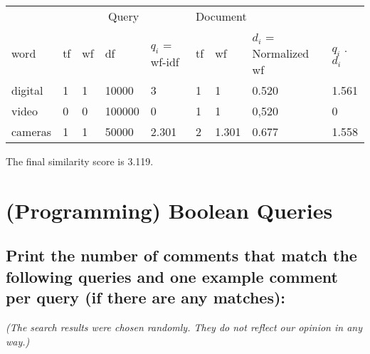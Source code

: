 \documentclass{scrartcl}
\begin{document}
\begin{table}[h]
\centering
\begin{tabular}{lllllllll}
                             & \multicolumn{4}{c}{Query}         & \multicolumn{3}{l}{Document}    &             \\ \cline{2-8}
word                         & tf & wf  & df  & $q_i$ = wf-idf & tf & wf  & $d_i$ = Normalized wf & $q_i$ . $d_i$ \\ \hline
\multicolumn{1}{l|}{digital} & 1  & 1   & 10000  & 3           & 1  & 1   &         0.520           &      1.561       \\
\multicolumn{1}{l|}{video}   & 0  & 0   & 100000 & 0           & 1  & 1   &         0,520           &      0      \\
\multicolumn{1}{l|}{cameras} & 1  & 1   & 50000  & 2.301       & 2  & 1.301 &       0.677           &      1.558      
\end{tabular}
\end{table}

The final similarity score is 3.119.


\section{(Programming) Boolean Queries
}

\subsection{Print the number of comments that match the following queries and one example comment
	per query (if there are any matches):}

\textit{(The search results were chosen randomly. They do not reflect our opinion in any way.)}
\end{document}
